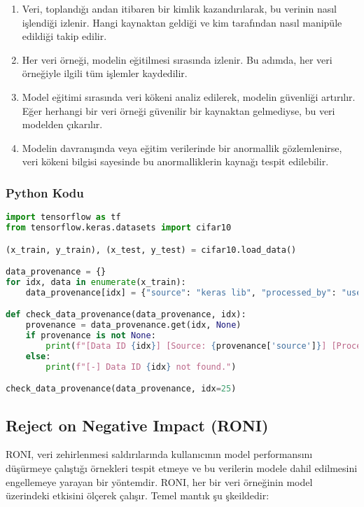 \begin{enumerate}
    \item Veri, toplandığı andan itibaren bir kimlik kazandırılarak, bu verinin nasıl işlendiği izlenir. Hangi kaynaktan geldiği ve kim tarafından nasıl manipüle edildiği takip edilir.
    \item Her veri örneği, modelin eğitilmesi sırasında izlenir. Bu adımda, her veri örneğiyle ilgili tüm işlemler kaydedilir.
    \item Model eğitimi sırasında veri kökeni analiz edilerek, modelin güvenliği artırılır. Eğer herhangi bir veri örneği güvenilir bir kaynaktan gelmediyse, bu veri modelden çıkarılır.
    \item Modelin davranışında veya eğitim verilerinde bir anormallik gözlemlenirse, veri kökeni bilgisi sayesinde bu anormalliklerin kaynağı tespit edilebilir.
\end{enumerate}

\subsubsection{Python Kodu}

\begin{lstlisting}[language=Python]
import tensorflow as tf
from tensorflow.keras.datasets import cifar10

(x_train, y_train), (x_test, y_test) = cifar10.load_data()

data_provenance = {}
for idx, data in enumerate(x_train):
    data_provenance[idx] = {"source": "keras lib", "processed_by": "user"}

def check_data_provenance(data_provenance, idx):
    provenance = data_provenance.get(idx, None)
    if provenance is not None:
        print(f"[Data ID {idx}] [Source: {provenance['source']}] [Processed by: {provenance['processed_by']}]")
    else:
        print(f"[-] Data ID {idx} not found.")

check_data_provenance(data_provenance, idx=25)
\end{lstlisting}

\newpage

\subsection{Reject on Negative Impact (RONI)}

RONI, veri zehirlenmesi saldırılarında kullanıcının model performansını düşürmeye çalıştığı örnekleri tespit etmeye ve bu verilerin modele dahil edilmesini engellemeye yarayan bir yöntemdir. RONI, her bir veri örneğinin model üzerindeki etkisini ölçerek çalışır. Temel mantık şu şkeildedir:

